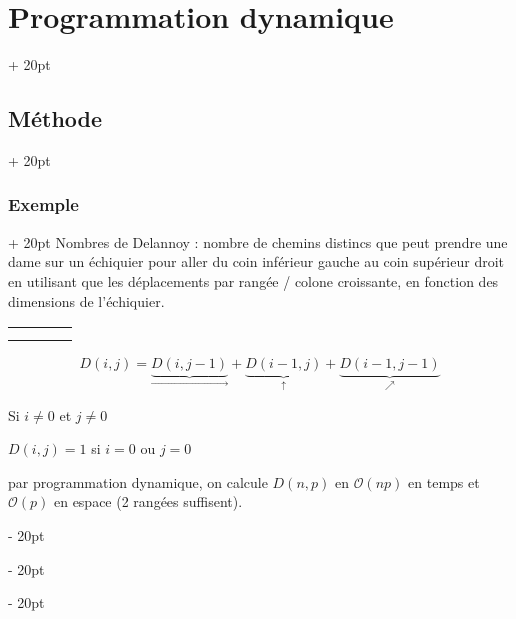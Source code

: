 \documentclass[a4paper, 12pt, twoside]{article}
\newcommand{\ind}[1][20pt]{\advance\leftskip + #1}
\newcommand{\deind}[1][20pt]{\advance\leftskip - #1}
\newenvironment{indt}[2][20pt]{#2 \par \ind[#1]}{\par \deind} %
\begin{document}
\begin{indt}{\section{Programmation dynamique}}
\begin{indt}{\subsection{Méthode}}
            \begin{indt}{\subsubsection{Exemple}}
                Nombres de Delannoy : nombre de chemins distincs que peut prendre une dame sur un échiquier pour aller du coin inférieur gauche au coin supérieur droit en utilisant que les déplacements par rangée / colone croissante, en fonction des dimensions de l'échiquier.
                
                \begin{center}
                    \begin{tabular}{|c|c|c|c|}
                        \hline
                        &&&
                        \\
                        \hline
                        &&&
                        \\
                        \hline
                        &&&
                        \\
                        \hline
                    \end{tabular}
                \end{center}
                
                \[ D(i, j) = \underbrace{D(i, j - 1)}_{\rightarrow} + \underbrace{D(i - 1, j)}_{\uparrow} + \underbrace{D(i - 1, j - 1)}_{\nearrow} \]
                
                Si $i \neq 0$ et $j \neq 0$
                
                $D(i, j) = 1$ si $i = 0$ ou $j = 0$
                
                par programmation dynamique, on calcule $D(n, p)$ en $\mathcal O(np)$ en temps et $\mathcal O(p)$ en espace (2 rangées suffisent).
            \end{indt}
        \end{indt}
        
    \end{indt}
    
    
    
\end{document}
